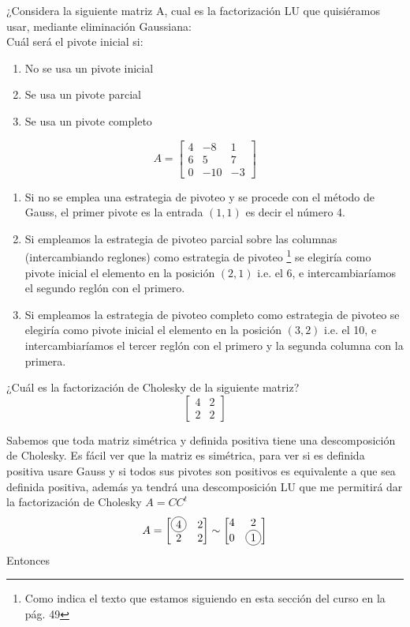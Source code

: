 \documentclass[paper=letter, fontsize=11pt]{scrartcl}
\numberwithin{equation}{section} %
\numberwithin{figure}{section} %
\numberwithin{table}{section} %
\newcommand\Circle[1]{%
  \tikz[baseline=(char.base)]\node[circle,draw,inner sep=2pt] (char) {#1};}
\newenvironment{cframed}[1][blue]
  {\begin{tcolorbox}[colframe=#1,colback=white]}
  {\end{tcolorbox}}
\begin{document}
\begin{enumerate}
\begin{cframed}[green]
\item ¿Considera la siguiente matriz A, cual es la factorización LU que quisiéramos usar, mediante eliminación Gaussiana:\\

Cuál será el pivote inicial si:\\

\begin{enumerate}
\item  No se usa un pivote inicial 
\item Se usa un pivote parcial 
\item Se usa un pivote completo 

\end{enumerate}
 \[
 A =
\begin{bmatrix}
4 & -8 & 1\\
6 & 5& 7\\
0 & -10 &-3
\end{bmatrix}
\]
\end{cframed}
\begin{enumerate}
\item Si no se emplea una estrategia de pivoteo y se procede con el método de Gauss, el primer pivote es la entrada $(1,1)$ es decir el número 4.
\item Si empleamos la estrategia de pivoteo parcial sobre las columnas (intercambiando reglones) como estrategia de pivoteo \footnote{Como indica el texto que estamos siguiendo en esta sección del curso en la pág. 49} se elegiría como pivote inicial el elemento en la posición $(2,1)$ i.e. el 6, e intercambiaríamos el segundo reglón con el primero.
\item Si empleamos la estrategia de pivoteo completo como estrategia de pivoteo se elegiría como pivote inicial el elemento en la posición $(3,2)$ i.e. el 10, e intercambiaríamos el tercer reglón con el primero y la segunda columna con la primera.
\end{enumerate}
\begin{cframed}[violet]
\item   ¿Cuál es la factorización de Cholesky de la siguiente matriz?\\
\[
\begin{bmatrix}
4 & 2\\
2 & 2
\end{bmatrix}
\]
\end{cframed}

Sabemos que toda matriz simétrica y definida positiva tiene una descomposición de Cholesky. Es fácil ver que la matriz es simétrica, para ver si es definida positiva usare Gauss y si todos sus pivotes son positivos es equivalente a que sea definida positiva, además ya tendrá una descomposición LU que me permitirá dar la factorización de Cholesky $A = CC^t$
\[
A = \begin{bmatrix}
\Circle{4} & 2\\
2 & 2
\end{bmatrix} \sim \begin{bmatrix}
4 & 2\\
0 & \Circle{1}\\
\end{bmatrix} 
\]
Entonces 


\end{enumerate}
\end{document}
